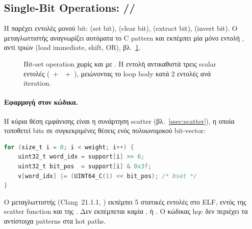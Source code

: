 \subsection{ Single-Bit Operations: //}
\label{ssec:zbs-single-bit}

Η  παρέχει εντολές μονού bit:  (set bit),
 (clear bit),  (extract bit),  (invert
bit). Ο μεταγλωττιστής αναγνωρίζει αυτόματα το C pattern
 και εκπέμπει μία μόνο εντολή , αντί
τριών (load immediate, shift, OR), βλ.~\cref{fig:zbs-disasm}.

\begin{figure}[htbp]
  
  \caption{Bit-set operation χωρίς και με . Η εντολή 
           αντικαθιστά τρεις scalar εντολές (~+~~+~),
           μειώνοντας το loop body κατά \num{2} εντολές ανά iteration.}
  \label{fig:zbs-disasm}
\end{figure}

\paragraph{Εφαρμογή στον \HQC κώδικα.}
Η κύρια θέση εμφάνισης είναι η συνάρτηση scatter
(βλ.~\cref{ssec:scatter}), η οποία τοποθετεί  bits σε
συγκεκριμένες θέσεις ενός πολυωνυμικού bit-vector:
%
\begin{lstlisting}[language=C, basicstyle=\small\ttfamily]
for (size_t i = 0; i < weight; i++) {
    uint32_t word_idx = support[i] >> 6;
    uint32_t bit_pos  = support[i] & 0x3f;
    v[word_idx] |= (UINT64_C(1) << bit_pos); /* bset */
}
\end{lstlisting}
%
Ο μεταγλωττιστής (Clang~21.1.1, ) εκπέμπει \num{5} στατικές εντολές
 στο ELF, εντός της scatter function και της
. Δεν εκπέμπεται καμία ,  ή
. Ο κώδικας \gls{hqc} δεν περιέχει τα αντίστοιχα patterns στα
hot paths.

